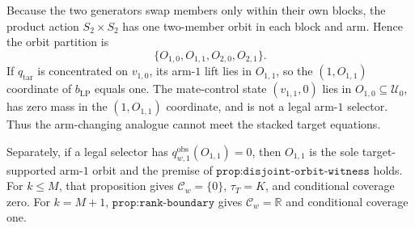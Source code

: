 Because the two generators swap members only within their own blocks, the product action \(S_2\times S_2\) has one two-member orbit in each block and arm. Hence the orbit partition is \[\{O_{1,0},O_{1,1},O_{2,0},O_{2,1}\}.\] If \(q_{\mathrm{tar}}\) is concentrated on \(v_{1,0}\), its arm-\(1\) lift lies in \(O_{1,1}\), so the \((1,O_{1,1})\) coordinate of \(b_{\mathrm{LP}}\) equals one. The mate-control state \((v_{1,1},0)\) lies in \(O_{1,0}\subseteq\mathcal U_0\), has zero mass in the \((1,O_{1,1})\) coordinate, and is not a legal arm-\(1\) selector. Thus the arm-changing analogue cannot meet the stacked target equations.

Separately, if a legal selector has \(q^{\mathrm{obs}}_{w,1}(O_{1,1})=0\), then \(O_{1,1}\) is the sole target-supported arm-\(1\) orbit and the premise of \(\texttt{prop:disjoint-orbit-witness}\) holds. For \(k\le M\), that proposition gives \(\mathcal C_w=\{0\}\), \(\tau_T=K\), and conditional coverage zero. For \(k=M+1\), \(\texttt{prop:rank-boundary}\) gives \(\mathcal C_w=\mathbb R\) and conditional coverage one.